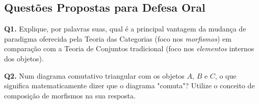 \subsection{Questões Propostas para Defesa Oral}

\begin{oralbox}
  \textbf{Q1.} Explique, por palavras suas, qual é a principal vantagem da mudança de paradigma oferecida pela Teoria das Categorias (foco nos \emph{morfismos}) em comparação com a Teoria de Conjuntos tradicional (foco nos \emph{elementos} internos dos objetos).
\end{oralbox}

\begin{oralbox}
  \textbf{Q2.} Num diagrama comutativo triangular com os objetos $A$, $B$ e $C$, o que significa matematicamente dizer que o diagrama "comuta"? Utilize o conceito de composição de morfismos na sua resposta.
\end{oralbox}